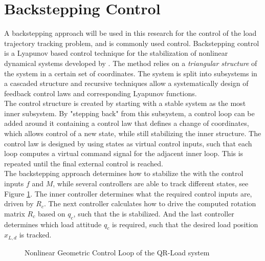 \newpage
\section{Backstepping Control}\label{sec:con.back}
A backstepping approach will be used in this research for the control of the load trajectory tracking problem, and is commonly used  control\cite{Mahony2012}. Backstepping control is a Lyapunov based control technique for the stabilization of nonlinear dynamical systems developed by \cite{Kanellakopoulos1991}. 
The method relies on a \textit{triangular structure} of the system in a certain set of coordinates. The system is split into subsystems in a cascaded structure and recursive techniques allow a systematically design of feedback control laws and corresponding Lyapunov functions.\\
The control structure is created by starting with a stable system as the most inner subsystem. 
By "stepping back" from this subsystem, a control loop can be added around it containing a control law that defines a change of coordinates, which allows control of a new state, while still stabilizing the inner structure. The control law is designed by using states as virtual control inputs, such that each loop computes a virtual command signal for the adjacent inner loop. This is repeated until the final external control is reached.\\
The backstepping approach determines how to stabilize the  with the control inputs $ f $ and $ M $, while several controllers are able to track different states, see Figure \ref{fig:con.loop}. 
The inner controller determines what the required control inputs are, driven by $ R_c $.  
The next controller calculates how to drive the computed rotation matrix $ R_c $ based on $ q_c $, such that the  is stabilized.
And the last controller determines which load attitude $ q_c $ is required, such that the desired load position $ x_{L,d} $ is tracked.
\begin{figure}[h!]
	\centering
	\caption{Nonlinear Geometric Control Loop of the QR-Load system \cite{Sreenath2013c}\label{fig:con.loop}}
\end{figure}	

